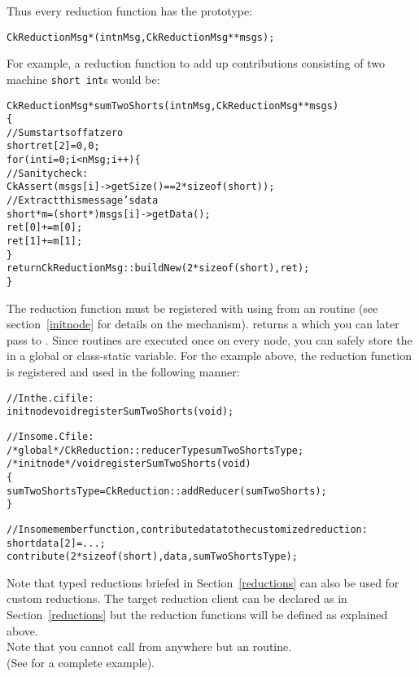 Thus every reduction function has the prototype:
\begin{alltt}
CkReductionMsg *(int nMsg,CkReductionMsg **msgs);
\end{alltt}

For example, a reduction function to add up contributions 
consisting of two machine {\tt short int}s would be:

\begin{alltt}
CkReductionMsg *sumTwoShorts(int nMsg,CkReductionMsg **msgs)
\{
  //Sum starts off at zero
  short ret[2]={0,0};
  for (int i=0;i<nMsg;i++) \{
    //Sanity check:
    CkAssert(msgs[i]->getSize()==2*sizeof(short));
    //Extract this message's data
    short *m=(short *)msgs[i]->getData();
    ret[0]+=m[0];
    ret[1]+=m[1];
  \}
  return CkReductionMsg::buildNew(2*sizeof(short),ret);
\}
\end{alltt}

The reduction function must be registered with \charmpp{} 
using  from
an  routine (see section~\ref{initnode} for details
on the  mechanism).   
returns a  which you can later 
pass to .  Since  routines are executed
once on every node, you can safely store the 
in a global or class-static variable.  For the example above, the reduction
function is registered and used in the following manner:

\begin{alltt}
//In the .ci file:
  initnode void registerSumTwoShorts(void);

//In some .C file:
/*global*/ CkReduction::reducerType sumTwoShortsType;
/*initnode*/ void registerSumTwoShorts(void)
\{
  sumTwoShortsType=CkReduction::addReducer(sumTwoShorts);
\}

//In some member function, contribute data to the customized reduction:
  short data[2]=...;
  contribute(2*sizeof(short),data,sumTwoShortsType);
\end{alltt}
Note that typed reductions briefed in Section~\ref{reductions}
can also be used for custom reductions. The target reduction client 
can be declared as in Section~\ref{reductions} but the reduction functions
will be defined as explained above.\\
Note that you cannot call 
from anywhere but an  routine.\\
(See  for a complete example).

